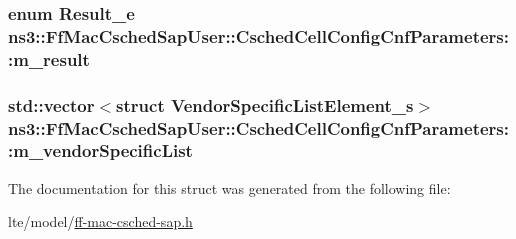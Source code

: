 \subsubsection[{\texorpdfstring{m\+\_\+result}{m_result}}]{\setlength{\rightskip}{0pt plus 5cm}enum {\bf Result\+\_\+e} ns3\+::\+Ff\+Mac\+Csched\+Sap\+User\+::\+Csched\+Cell\+Config\+Cnf\+Parameters\+::m\+\_\+result}\hypertarget{structns3_1_1FfMacCschedSapUser_1_1CschedCellConfigCnfParameters_a2db8ec602bba8a77130a84e962a95305}{}\label{structns3_1_1FfMacCschedSapUser_1_1CschedCellConfigCnfParameters_a2db8ec602bba8a77130a84e962a95305}
\subsubsection[{\texorpdfstring{m\+\_\+vendor\+Specific\+List}{m_vendorSpecificList}}]{\setlength{\rightskip}{0pt plus 5cm}std\+::vector$<$struct {\bf Vendor\+Specific\+List\+Element\+\_\+s}$>$ ns3\+::\+Ff\+Mac\+Csched\+Sap\+User\+::\+Csched\+Cell\+Config\+Cnf\+Parameters\+::m\+\_\+vendor\+Specific\+List}\hypertarget{structns3_1_1FfMacCschedSapUser_1_1CschedCellConfigCnfParameters_a8c043d89323ac7ebca4a53b5fda1234d}{}\label{structns3_1_1FfMacCschedSapUser_1_1CschedCellConfigCnfParameters_a8c043d89323ac7ebca4a53b5fda1234d}


The documentation for this struct was generated from the following file\+:\begin{DoxyCompactItemize}
\item 
lte/model/\hyperlink{ff-mac-csched-sap_8h}{ff-\/mac-\/csched-\/sap.\+h}\end{DoxyCompactItemize}
